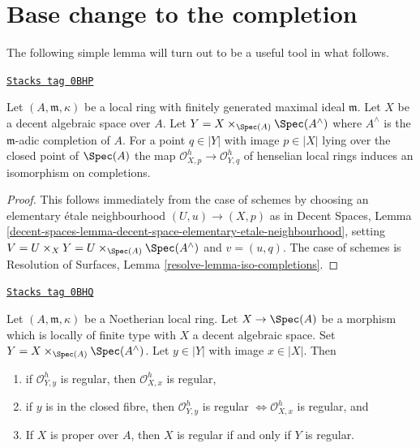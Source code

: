 \section{Base change to the completion}
\label{spaces-resolve-section-aux}
The following simple lemma will turn out to be a useful tool in what follows.

\begin{lemma}
\label{spaces-resolve-lemma-iso-completions}
\href{https://stacks.math.columbia.edu/tag/0BHP}{\texttt{Stacks tag 0BHP}}

Let $(A, \mathfrak m, \kappa)$ be a local ring with finitely generated
maximal ideal $\mathfrak m$. Let $X$ be a decent algebraic
space over $A$. Let $Y = X \times_{\Spec(A)} \Spec(A^\wedge)$ where
$A^\wedge$ is the $\mathfrak m$-adic completion of $A$.
For a point $q \in |Y|$ with image $p \in |X|$ lying
over the closed point of $\Spec(A)$ the map
$\mathcal{O}_{X, p}^h \to \mathcal{O}_{Y, q}^h$
of henselian local rings induces an isomorphism on completions.
\end{lemma}

\begin{proof}
This follows immediately from the case of schemes by
choosing an elementary \'etale neighbourhood $(U, u) \to (X, p)$
as in Decent Spaces, Lemma
\ref{decent-spaces-lemma-decent-space-elementary-etale-neighbourhood},
setting $V = U \times_X Y = U \times_{\Spec(A)} \Spec(A^\wedge)$
and $v = (u, q)$.
The case of schemes is
Resolution of Surfaces, Lemma \ref{resolve-lemma-iso-completions}.
\end{proof}

\begin{lemma}
\label{spaces-resolve-lemma-port-regularity-to-completion}
\href{https://stacks.math.columbia.edu/tag/0BHQ}{\texttt{Stacks tag 0BHQ}}

Let $(A, \mathfrak m, \kappa)$ be a Noetherian local ring.
Let $X \to \Spec(A)$ be a morphism which is locally of finite type
with $X$ a decent algebraic space. Set
$Y = X \times_{\Spec(A)} \Spec(A^\wedge)$. Let $y \in |Y|$
with image $x \in |X|$. Then
\begin{enumerate}
\item if $\mathcal{O}_{Y, y}^h$ is regular, then
$\mathcal{O}_{X, x}^h$ is regular,
\item if $y$ is in the closed fibre, then $\mathcal{O}_{Y, y}^h$ is regular
$\Leftrightarrow \mathcal{O}_{X, x}^h$ is regular, and
\item If $X$ is proper over $A$, then $X$ is regular
if and only if $Y$ is regular.
\end{enumerate}
\end{lemma}

